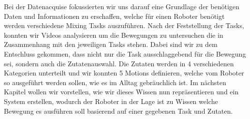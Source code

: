 Bei der Datenacquise fokussierten wir uns darauf eine Grundlage der benötigen Daten und Informationen zu erschaffen, welche für einen Roboter benötigt werden verschiedene Mixing Tasks auszuführen.
Nach der Feststellung der Tasks, konnten wir Videos analysieren um die Bewegungen zu untersuchen die in Zusammenhang mit den jeweiligen Tasks stehen. Dabei sind wir zu dem Entschluss gekommen, dass nicht nur die Task ausschlaggebend für die Bewegung sei, sondern auch die Zutatenauswahl.
Die Zutaten werden in 4 verschiedenen Kategorien unterteilt und wir konnten 5 Motions definieren, welche vom Roboter so ausgeführt werden sollen, wie es im Alltag gebräuchlich ist.
Im nächsten Kapitel wollen wir vorstellen, wie wir dieses Wissen nun repräsentieren und ein System erstellen, wodurch der Roboter in der Lage ist zu Wissen welche Bewegung es ausführen soll basierend auf einer gegebenen Task und Zutaten.
\newpage